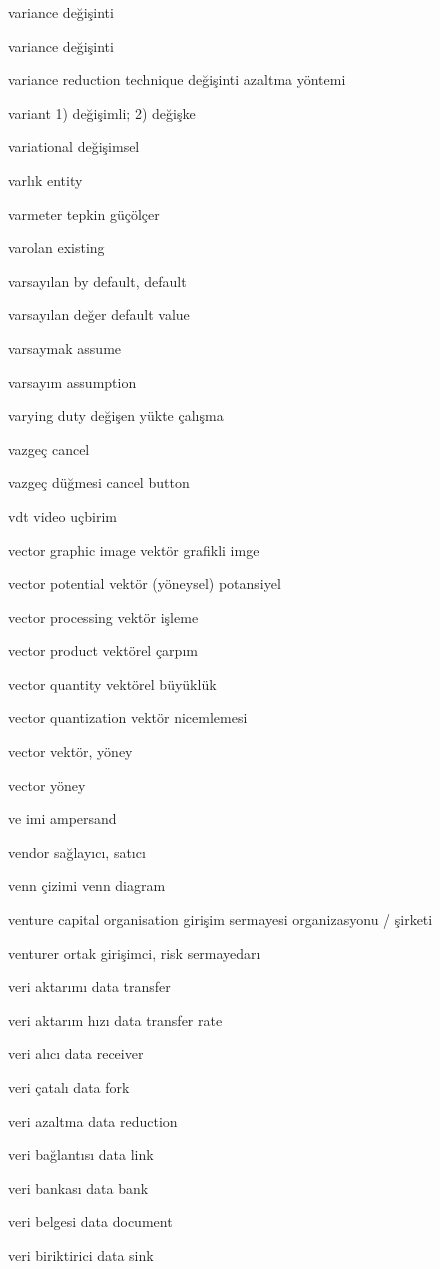 \documentclass[12pt,fleqn]{article}\usepackage{../../common}
\begin{document}
variance değişinti

variance değişinti

variance reduction technique değişinti azaltma yöntemi

variant 1) değişimli; 2) değişke

variational değişimsel

varlık entity

varmeter tepkin güçölçer

varolan existing

varsayılan by default, default

varsayılan değer default value

varsaymak assume

varsayım assumption

varying duty değişen yükte çalışma

vazgeç cancel

vazgeç düğmesi cancel button

vdt video uçbirim

vector graphic image vektör grafikli imge

vector potential vektör (yöneysel) potansiyel

vector processing vektör işleme

vector product vektörel çarpım

vector quantity vektörel büyüklük

vector quantization vektör nicemlemesi

vector vektör, yöney

vector yöney

ve imi ampersand

vendor sağlayıcı, satıcı

venn çizimi venn diagram

venture capital organisation girişim sermayesi organizasyonu / şirketi

venturer ortak girişimci, risk sermayedarı

veri aktarımı data transfer

veri aktarım hızı data transfer rate

veri alıcı data receiver

veri çatalı data fork

veri azaltma data reduction

veri bağlantısı data link

veri bankası data bank

veri belgesi data document

veri biriktirici data sink
\end{document}
